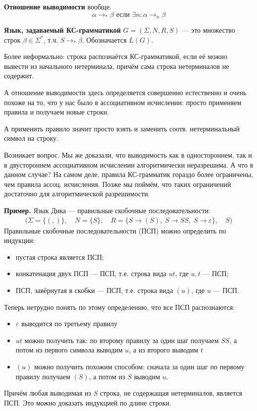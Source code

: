 \begin{conj}
    \textbf{Отношение выводимости} вообще.
    $$ \alpha \to_* \beta \text{ если } \exists n : \alpha \to_n \beta $$
\end{conj}

\begin{conj}
    \textbf{Язык, задаваемый КС-грамматикой} $G = (\Sigma, N, R, S)$ --- это множество строк $\beta \in \Sigma^*$, т.ч. $S \to_* \beta$. Обозначается $L(G)$.
\end{conj}

Более неформально: строка распознаётся КС-грамматикой, если её можно вывести из начального нетерминала, причём сама строка нетерминалов не содержит. 

А отношение выводимости здесь определяется совершенно естественно и очень похоже на то, что у нас было в ассоциативном исчислении: просто применяем правила и получаем новые строки. 

А применить правило значит просто взять и заменить соотв. нетерминальный символ на строку.

Возникает вопрос. Мы же доказали, что выводимость как в одностороннем, так и в двустороннем ассоциативном исчислении алгоритмически неразрешима. А что в данном случае? На самом деле, правила КС-грамматик гораздо более ограничены, чем правила ассоц. исчисления. Позже мы поймём, что таких ограничений достаточно для алгоритмической разрешимости. 

\textbf{Пример.} Язык Дика --- правильные скобочные последовательности:
\begin{gather*}
    \bigg(\Sigma = \{ (, ) \}, \quad N = \{ S \}, \quad R = \{ S \to (S), \; S \to S S, \; S \to \varepsilon \}, \quad S \bigg)
\end{gather*} 
Правильные скобочные последовательности (ПСП) можно определить по индукции:
\begin{itemize}
    \item пустая строка является ПСП;
    \item конкатенация двух ПСП --- ПСП, т.е. строка вида $ut$, где $u,t$ --- ПСП;
    \item ПСП, завёрнутая в скобки --- ПСП, т.е. строка вида $(u)$, где $u$ --- ПСП.
\end{itemize}
Теперь нетрудно понять по этому определению, что все ПСП распознаются:
\begin{itemize}
    \item $\varepsilon$ выводится по третьему правилу
    \item $ut$ можно получить так: по второму правилу за один шаг получаем $S S$, а потом из первого символа выводим $u$, а из второго выводим $t$
    \item $(u)$ можно получить похожим способом: сначала за один шаг по первому правилу получаем $(S)$, а потом из $S$ выводим $u$.
\end{itemize}
Причём любая выводимая из $S$ строка, не содержащая нетерминалов, является ПСП. Это можно доказать индукцией по длине строки.

